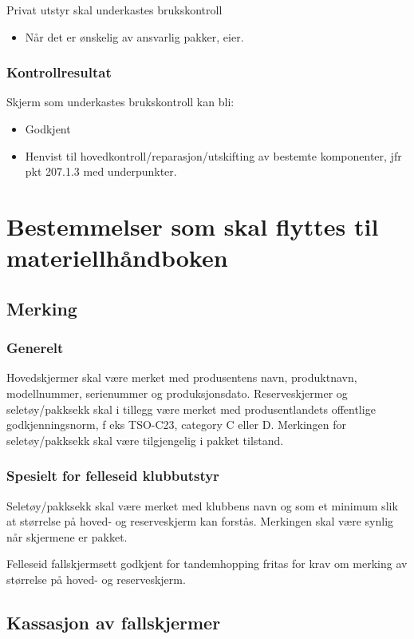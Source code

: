 Privat utstyr skal underkastes brukskontroll
\begin{itemize}
	\item Når det er ønskelig av ansvarlig pakker, eier.
\end{itemize}

\subsubsection{Kontrollresultat}
Skjerm som underkastes brukskontroll kan bli:
\begin{itemize}
	\item Godkjent
	\item Henvist til hovedkontroll/reparasjon/utskifting av bestemte komponenter, jfr pkt 207.1.3 med underpunkter.
\end{itemize}

\section{Bestemmelser som skal flyttes til materiellhåndboken}
\subsection{Merking}
\subsubsection{Generelt}
Hovedskjermer skal være merket med produsentens navn, produktnavn, modellnummer, serienummer og produksjonsdato. Reserveskjermer og seletøy/pakksekk skal i tillegg være merket med produsentlandets offentlige godkjenningsnorm, f eks TSO-C23, category C eller D. Merkingen for seletøy/pakksekk skal være tilgjengelig i pakket tilstand.

\subsubsection{Spesielt for felleseid klubbutstyr}
Seletøy/pakksekk skal være merket med klubbens navn og som et minimum slik at størrelse på hoved- og reserveskjerm kan forstås. Merkingen skal være synlig når skjermene er pakket.

Felleseid fallskjermsett godkjent for tandemhopping fritas for krav om merking av størrelse på hoved- og reserveskjerm.

\subsection{Kassasjon av fallskjermer}
